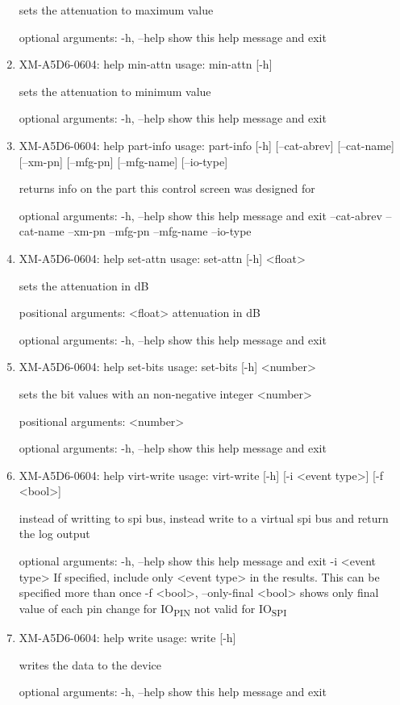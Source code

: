 \documentclass[11pt]{article}
\begin{document}
\begin{enumerate}
sets the attenuation to maximum value

optional arguments:
  -h, --help  show this help message and exit

\item XM-A5D6-0604: help min-attn
\label{sec:orgf16af0e}
usage: min-attn [-h]

sets the attenuation to minimum value

optional arguments:
  -h, --help  show this help message and exit

\item XM-A5D6-0604: help part-info
\label{sec:orgd966f2b}
usage: part-info  [-h] [--cat-abrev] [--cat-name] [--xm-pn] [--mfg-pn] [--mfg-name]
        [--io-type]

returns info on the part this control screen was designed for

optional arguments:
  -h, --help   show this help message and exit
  --cat-abrev
  --cat-name
  --xm-pn
  --mfg-pn
  --mfg-name
  --io-type

\item XM-A5D6-0604: help set-attn
\label{sec:orgd00488b}
usage: set-attn [-h] <float>

sets the attenuation in dB

positional arguments:
  <float>     attenuation in dB

optional arguments:
  -h, --help  show this help message and exit

\item XM-A5D6-0604: help set-bits
\label{sec:orgcdebdf3}
usage: set-bits [-h] <number>

sets the bit values with an non-negative integer <number>

positional arguments:
  <number>

optional arguments:
  -h, --help  show this help message and exit

\item XM-A5D6-0604: help virt-write
\label{sec:orgee31257}
usage: virt-write [-h] [-i <event type>] [-f <bool>]

instead of writting to spi bus, instead write to a virtual spi bus and return
the log output

optional arguments:
  -h, --help            show this help message and exit
  -i <event type>       If specified, include only <event type> in the
                        results. This can be specified more than once
  -f <bool>, --only-final <bool>
                        shows only final value of each pin change for IO\textsubscript{PIN}
                        not valid for IO\textsubscript{SPI}

\item XM-A5D6-0604: help write
\label{sec:org8df79d6}
usage: write [-h]

writes the data to the device

optional arguments:
  -h, --help  show this help message and exit
\end{enumerate}
\end{document}
